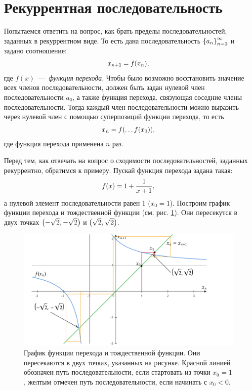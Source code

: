 \documentclass[12pt]{article}
\begin{document}
\section{Рекуррентная последовательность}
Попытаемся ответить на вопрос, как брать пределы последовательностей, заданных в рекуррентном виде. То есть дана последовательность $\qty{a_n}_{n=0}^\infty$ и задано соотношение:
\begin{equation}
    x_{n+1} = f\qty(x_n),
\end{equation}
где $f(x)$~\----~\emph{функция перехода}. Чтобы было возможно восстановить значение всех членов последовательности, должен быть задан нулевой член последовательности $a_0$, а также функция перехода, связующая соседние члены последовательности. Тогда каждый член последовательности можно выразить через нулевой член с помощью суперпозиций функции перехода, то есть
\begin{equation}
    x_n = f\qty(\ldots f\qty(x_0)),
\end{equation}
где функция перехода применена $n$ раз. 
\par
Перед тем, как отвечать на вопрос о сходимости последовательностей, заданных рекуррентно, обратимся к примеру. Пускай функция перехода задана такая:
\begin{equation}
    f\qty(x) = 1 + \dfrac{1}{x+1},
\end{equation}
а нулевой элемент последовательности равен 1 ($x_0 = 1$). Построим график функции перехода и тождественной функции (см. рис. \ref{fig:9}). Они пересекутся в двух точках $\qty(-\sqrt{2},-\sqrt{2})$ и $\qty(\sqrt{2},\sqrt{2})$.
\begin{figure}[ht]
    \centering
    \includegraphics[width = 1\textwidth]{fig9.png}
    \caption{График функции перехода и тождественной функции. Они пересекаются в двух точках, указанных на рисунке. Красной линией обозначен путь последовательности, если стартовать из точки $x_0=1$, желтым отмечен путь последовательности, если начинать с $x_0 < 0$.}
    \label{fig:9}
\end{figure}
\end{document}
